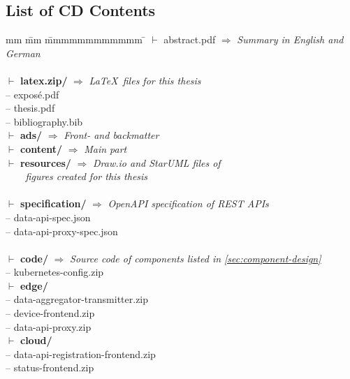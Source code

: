 \begin{appendices}
\FloatBarrier


\chapter{List of CD Contents}
\label{app:cd-contents}

\begin{tabbing}
	mm \= mm \= mmmmmmmmmmmm \= \kill
	$\vdash$ abstract.pdf 						\> \> \> $\Rightarrow$ \textit{Summary in English and German} \\
	\\
	$\vdash$ \textbf{latex.zip/} 				\> \> \> $\Rightarrow$ \textit{\LaTeX~files for this thesis} \\
	\> -- exposé.pdf \\
	\> -- thesis.pdf \\
	\> -- bibliography.bib \\
	\> $\vdash$ \textbf{ads/}   			\> \> $\Rightarrow$ \textit{Front- and backmatter} \\
	\> $\vdash$ \textbf{content/}   		\> \> $\Rightarrow$ \textit{Main part} \\
	\> $\vdash$ \textbf{resources/}   		\> \> $\Rightarrow$ \textit{Draw.io and StarUML files of} \\
											\> \> \> 			\textit{~~~~figures created for this thesis} \\
	\\
	$\vdash$ \textbf{specification/} 		\> \> \> $\Rightarrow$ \textit{OpenAPI specification of \acs{REST} \acsp{API}} \\
	\> -- data-api-spec.json \\
	\> -- data-api-proxy-spec.json \\
	\\
	$\vdash$ \textbf{code/} 				\> \> \> $\Rightarrow$ \textit{Source code of components listed in \autoref{sec:component-design}} \\
	\> -- kubernetes-config.zip \\
	\> $\vdash$ \textbf{edge/} \\
	\> \> -- data-aggregator-transmitter.zip \\
	\> \> -- device-frontend.zip \\
	\> \> -- data-api-proxy.zip \\
	\> $\vdash$ \textbf{cloud/} \\
	\> \> -- data-api-registration-frontend.zip \\
	\> \> -- status-frontend.zip \\
	\\
\end{tabbing}

\end{appendices}
